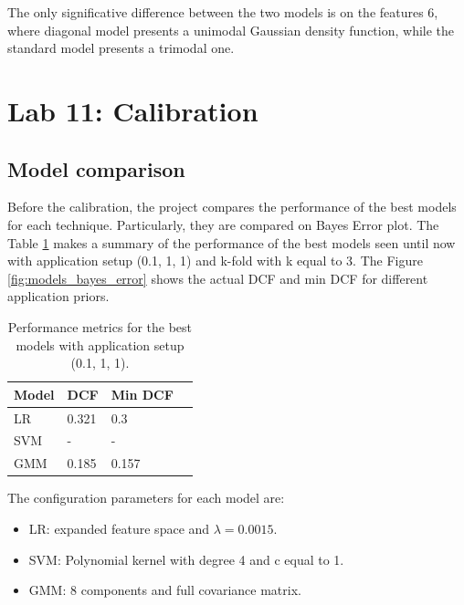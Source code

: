 \documentclass{article}
\begin{document}
The only significative difference between the two models is on the features 6, where diagonal model presents a unimodal Gaussian density function, while the standard model presents a trimodal one. 

\section{Lab 11: Calibration}

\subsection{Model comparison}
Before the calibration, the project compares the performance of the best models for each technique. Particularly, they are compared on Bayes Error plot. The Table \ref{tab:models_performance} makes a summary of the performance of the best models seen until now with application setup (0.1, 1, 1) and k-fold with k equal to 3. The Figure \ref{fig:models_bayes_error} shows the actual DCF and min DCF for different application priors.

\begin{table}[ht]
    \centering
    \begin{tabularx}{\textwidth}{lXXX}
        \toprule
        \textbf{Model} & \textbf{DCF} & \textbf{Min DCF} \\
        \midrule
        LR & 0.321 & 0.3 \\
        SVM & - & - \\
        GMM & 0.185 & 0.157 \\
        \bottomrule
    \end{tabularx}
    \caption{Performance metrics for the best models with application setup (0.1, 1, 1).}
    \label{tab:models_performance}
\end{table}

The configuration parameters for each model are:
\begin{itemize}
    \item LR: expanded feature space and $\lambda = 0.0015$.
    \item SVM: Polynomial kernel with degree 4 and c equal to 1.
    \item GMM: 8 components and full covariance matrix.
\end{itemize}
\end{document}

